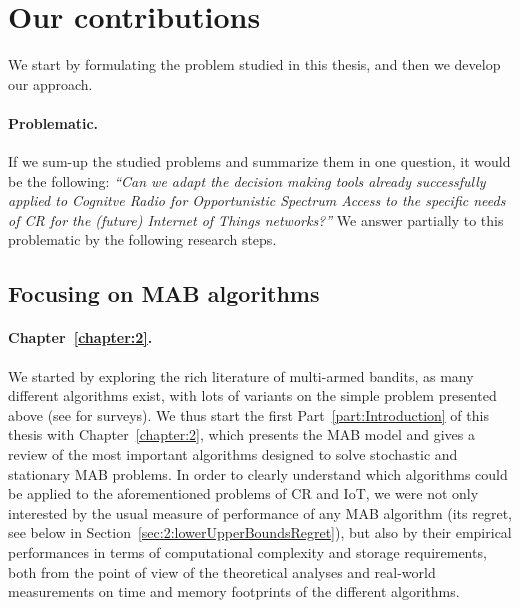 
\section{Our contributions}
\label{sec:1:contributions}

We start by formulating the problem studied in this thesis, and then we develop our approach.

\paragraph{Problematic.}
%
If we sum-up the studied problems and summarize them in one question, it would be the following:
\emph{``Can we adapt the decision making tools already successfully applied to Cognitve Radio for Opportunistic Spectrum Access to the specific needs of CR for the (future) Internet of Things networks?''}
%
We answer partially to this problematic by the following research steps.


\subsection{Focusing on MAB algorithms}

\paragraph{Chapter~\ref{chapter:2}.}
%
We started by exploring the rich literature of multi-armed bandits,
as many different algorithms exist, with lots of variants on the simple problem presented above (see \cite{LattimoreBanditAlgorithmsBook,Slivkins2019} for surveys).
We thus start the first Part~\ref{part:Introduction} of this thesis with Chapter~\ref{chapter:2}, which presents the MAB model and gives a review of the most important algorithms designed to solve stochastic and stationary MAB problems.
%
In order to clearly understand which algorithms could be applied to the aforementioned problems of CR and IoT,
we were not only interested by the usual measure of performance of any MAB algorithm (its regret, see below in Section~\ref{sec:2:lowerUpperBoundsRegret}),
but also by their empirical performances in terms of computational complexity and storage requirements, both from the point of view of the theoretical analyses and real-world measurements on time and memory footprints of the different algorithms.


